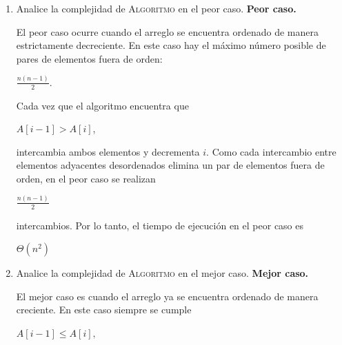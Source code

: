 \documentclass{article}
\begin{document}
\begin{enumerate}
\begin{enumerate}
                 \textbf{Terminación.}

                El ciclo termina cuando ($i=|A|$). Por el invariante,
                [
                $A[0..i-1]=A[0..|A|-1]$
                ]
                se encuentra ordenado, por lo que todo el arreglo (A) está ordenado
                de manera creciente. 


                Y ya por último, como el algoritmo únicamente intercambia elementos in place,
                $A$ conserva los mismos elementos del arreglo original. Por lo
                tanto, \textsc{Algoritmo} es correcto.

                   \medskip

            
            \item Analice la complejidad de \textsc{Algoritmo} en el peor caso.
                        \textbf{Peor caso.}

            El peor caso ocurre cuando el arreglo se encuentra ordenado de manera
            estrictamente decreciente. En este caso hay el máximo número posible de pares de elementos fuera de orden:

            $
            \frac{n(n-1)}{2}.
            $

            Cada vez que el algoritmo encuentra que
            
            $A[i-1]>A[i]$,
            
            intercambia ambos elementos y decrementa $i$. Como cada intercambio
            entre elementos adyacentes desordenados elimina un par de elementos fuera de orden, en el peor caso se
            realizan

           $ 
            \frac{n(n-1)}{2}
            $

            intercambios. Por lo tanto, el tiempo de ejecución en el peor caso es

            
            $\Theta(n^2)$
            

            \medskip



            \item Analice la complejidad de \textsc{Algoritmo} en el mejor caso.
            \textbf{Mejor caso.}

            El mejor caso es cuando el arreglo ya se encuentra ordenado de manera
            creciente. En este caso siempre se cumple

            
            $A[i-1]\leq A[i],
            $


\end{enumerate}
\end{enumerate}
\end{document}
